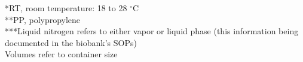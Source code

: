 \documentclass[preprint,12pt]{elsarticle}
\begin{document}
\noindent\footnotesize
*RT, room temperature: 18 to 28 \(^{\circ}\)C\\
**PP, polypropylene\\
***Liquid nitrogen refers to either vapor or liquid phase (this information being documented in the biobank's SOPs)\\
Volumes refer to container size
\normalsize
\par\vspace{1.4em}



\begingroup
\footnotesize
\setlength{\tabcolsep}{3.6pt}
\renewcommand{\arraystretch}{1.08}
\setlength{\LTpre}{0.6em}
\setlength{\LTpost}{0.6em}
\end{document}

